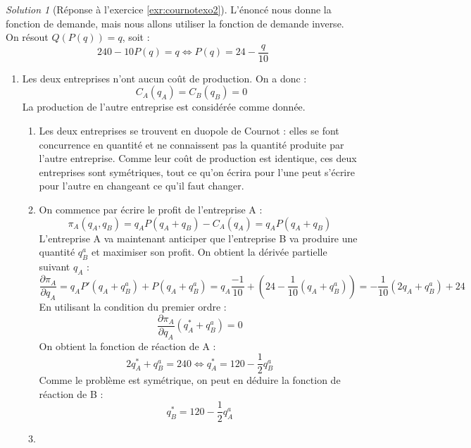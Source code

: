 \documentclass[
]{book}
\providecommand{\tightlist}{%
  \setlength{\itemsep}{0pt}\setlength{\parskip}{0pt}}
\theoremstyle{definition}
\theoremstyle{definition}
\theoremstyle{definition}
\theoremstyle{definition}
\theoremstyle{remark}
\newtheorem*{solution}{Solution}
\begin{document}
\begin{solution}[Réponse à l'exercice \ref{exr:cournotexo2}]
L'énoncé nous donne la fonction de demande, mais nous allons utiliser la fonction de demande inverse.
On résout \(Q(P(q))=q\), soit :
\[240-10P(q)=q\Leftrightarrow P(q)=24-\frac{q}{10}\]

\begin{enumerate}
\def\labelenumi{\arabic{enumi}.}
\tightlist
\item
  Les deux entreprises n'ont aucun coût de production.
  On a donc :
  \[C_{A}(q_A)=C_{B}(q_B)=0\]
  La production de l'autre entreprise est considérée comme donnée.

  \begin{enumerate}
  \def\labelenumii{\alph{enumii}.}
  \tightlist
  \item
    Les deux entreprises se trouvent en duopole de Cournot : elles se font concurrence en quantité et ne connaissent pas la quantité produite par l'autre entreprise.
    Comme leur coût de production est identique, ces deux entreprises sont symétriques, tout ce qu'on écrira pour l'une peut s'écrire pour l'autre en changeant ce qu'il faut changer.
  \item
    On commence par écrire le profit de l'entreprise A :
    \[\pi_A(q_A, q_B)=q_AP(q_A+q_B)-C_A(q_A)=q_AP(q_A+q_B)\]
    L'entreprise A va maintenant anticiper que l'entreprise B va produire une quantité \(q_B^a\) et maximiser son profit.
    On obtient la dérivée partielle suivant \(q_A\) :
    \[\frac{\partial\pi_A}{\partial q_A}=q_AP'(q_A+q_B^a)+P(q_A+q_B^a)=q_A\frac{-1}{10}+(24-\frac{1}{10}(q_A+q_B^a))=-\frac{1}{10}(2q_A+q_B^a)+24\]
    En utilisant la condition du premier ordre :
    \[\frac{\partial\pi_A}{\partial q_A}(q_A^*+q_B^a)=0\]
    On obtient la fonction de réaction de A :
    \[2q_A^*+q_B^a=240\Leftrightarrow q_A^*=120-\frac{1}{2}q_B^a\]
    Comme le problème est symétrique, on peut en déduire la fonction de réaction de B :
    \[q_B^*=120-\frac{1}{2}q_A^a\]
  \item
  \end{enumerate}
\end{enumerate}


\end{solution}
\end{document}
